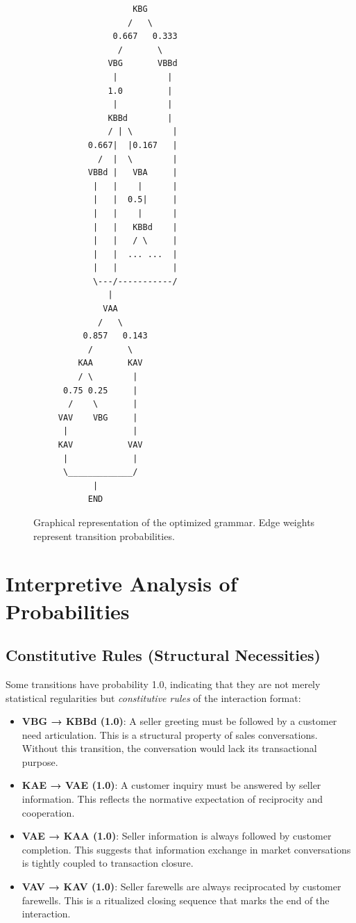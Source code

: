 \documentclass[12pt,a4paper]{article}
\begin{document}
\begin{figure}[H]
\centering
\begin{verbatim}
                    KBG
                   /   \
                0.667   0.333
                 /       \
               VBG       VBBd
                |          |
               1.0         |
                |          |
               KBBd        |
               / | \        |
           0.667|  |0.167   |
             /  |  \        |
           VBBd |   VBA     |
            |   |    |      |
            |   |  0.5|     |
            |   |    |      |
            |   |   KBBd    |
            |   |   / \     |
            |   |  ... ...  |
            |   |           |
            \---/-----------/
               |
              VAA
             /   \
          0.857   0.143
           /       \
         KAA       KAV
         / \        |
      0.75 0.25     |
       /    \       |
     VAV    VBG     |
      |             |
     KAV           VAV
      |             |
      \_____________/
            |
           END
\end{verbatim}
\caption{Graphical representation of the optimized grammar. Edge weights
represent transition probabilities.}
\label{fig:grammar}
\end{figure}

\section{Interpretive Analysis of Probabilities}

\subsection{Constitutive Rules (Structural Necessities)}

Some transitions have probability 1.0, indicating that they are not merely
statistical regularities but \textit{constitutive rules} of the interaction
format:

\begin{itemize}
    \item \textbf{VBG → KBBd (1.0)}: A seller greeting must be followed by a
    customer need articulation. This is a structural property of sales
    conversations. Without this transition, the conversation would lack
    its transactional purpose.
    
    \item \textbf{KAE → VAE (1.0)}: A customer inquiry must be answered by
    seller information. This reflects the normative expectation of reciprocity
    and cooperation.
    
    \item \textbf{VAE → KAA (1.0)}: Seller information is always followed by
    customer completion. This suggests that information exchange in market
    conversations is tightly coupled to transaction closure.
    
    \item \textbf{VAV → KAV (1.0)}: Seller farewells are always reciprocated
    by customer farewells. This is a ritualized closing sequence that marks
    the end of the interaction.
\end{itemize}
\end{document}
